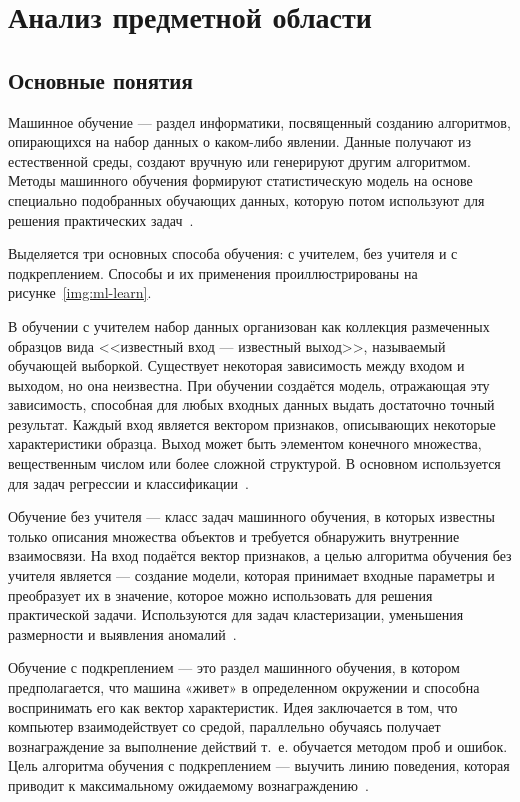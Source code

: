 \chapter{Анализ предметной области}

\section{Основные понятия}
Машинное обучение --- раздел информатики, посвященный созданию алгоритмов, опирающихся на набор данных о каком-либо явлении. Данные получают из естественной среды, создают вручную или генерируют другим алгоритмом. Методы машинного обучения формируют статистическую модель на основе специально подобранных обучающих данных, которую потом используют для решения практических задач~\cite{ML_no_wors}.


Выделяется три основных способа обучения: с учителем, без учителя и с подкреплением. Способы и их применения проиллюстрированы на рисунке~\ref{img:ml-learn}.


В обучении с учителем набор данных организован как коллекция размеченных образцов вида <<известный вход --- известный выход>>, называемый обучающей выборкой. Существует некоторая зависимость между входом и выходом, но она неизвестна. При обучении создаётся модель, отражающая эту зависимость, способная для любых  входных данных выдать достаточно точный результат. Каждый вход является вектором признаков, описывающих некоторые характеристики образца. Выход может быть элементом конечного множества, вещественным числом или более сложной структурой. В основном используется для задач регрессии и классификации~\cite{ML_no_wors}.

Обучение без учителя --- класс задач машинного обучения, в которых известны только описания множества объектов и требуется обнаружить внутренние взаимосвязи. На вход подаётся вектор признаков, а целью алгоритма обучения без учителя является --- создание модели, которая принимает входные параметры и преобразует их в значение, которое можно использовать для решения практической задачи. Используются для задач кластеризации, уменьшения размерности и выявления аномалий~\cite{ML_no_wors}.

Обучение с подкреплением --- это раздел машинного обучения, в котором предполагается, что машина «живет» в определенном окружении и способна воспринимать его как вектор характеристик. Идея заключается в том, что компьютер взаимодействует со средой, параллельно обучаясь  получает вознаграждение за выполнение действий т.~е. обучается методом проб и ошибок. Цель алгоритма обучения с подкреплением — выучить линию поведения, которая приводит к максимальному ожидаемому вознаграждению~\cite{ML_no_wors}.

